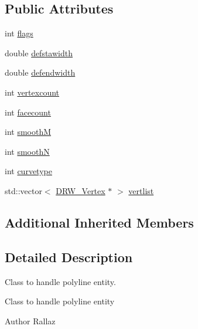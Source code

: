 \subsection*{Public Attributes}
\begin{DoxyCompactItemize}
\item 
int \hyperlink{classDRW__Polyline_a328f232ca859ae9f5561e78457833099}{flags}
\item 
double \hyperlink{classDRW__Polyline_a47b35f26221533fdd0d7ef2d91925ca3}{defstawidth}
\item 
double \hyperlink{classDRW__Polyline_a8818ce849a6704cb7d83ba7792f3db50}{defendwidth}
\item 
int \hyperlink{classDRW__Polyline_ac4bec6f33dd2f8967548d7163525537e}{vertexcount}
\item 
int \hyperlink{classDRW__Polyline_ae7e68c83478c4dad5550cfc44fa524bd}{facecount}
\item 
int \hyperlink{classDRW__Polyline_aa244ad2243bc7312e01b39876da95edb}{smooth\-M}
\item 
int \hyperlink{classDRW__Polyline_a35895911a129d179e1197efa9ca0ec34}{smooth\-N}
\item 
int \hyperlink{classDRW__Polyline_a9cd44431960f6b199c218da6ca475fdb}{curvetype}
\item 
std\-::vector$<$ \hyperlink{classDRW__Vertex}{D\-R\-W\-\_\-\-Vertex} $\ast$ $>$ \hyperlink{classDRW__Polyline_ab001a6b7d6fec6298f52cc1f47df6c87}{vertlist}
\end{DoxyCompactItemize}
\subsection*{Additional Inherited Members}


\subsection{Detailed Description}
Class to handle polyline entity. 

Class to handle polyline entity \begin{DoxyAuthor}{Author}
Rallaz 
\end{DoxyAuthor}


